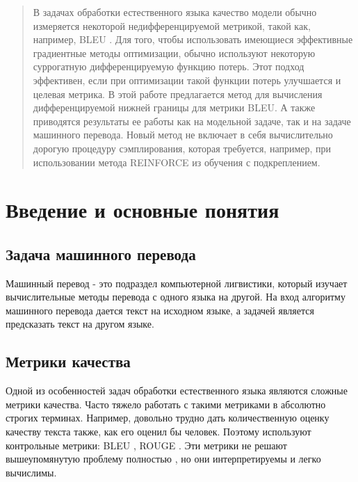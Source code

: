 \documentclass[14pt, a4paper]{extarticle}
\begin{document}
\begin{abstract}
В задачах обработки естественного языка качество модели обычно измеряется некоторой недифференцируемой метрикой, такой как, например, BLEU \cite{bleu}.
Для того, чтобы использовать имеющиеся эффективные градиентные методы оптимизации, обычно используют некоторую суррогатную дифференцируемую функцию потерь.
Этот подход эффективен, если при оптимизации такой функции потерь улучшается и целевая метрика.
В этой работе предлагается метод для вычисления дифференцируемой нижней границы для метрики BLEU.
А также приводятся результаты ее работы как на модельной задаче, так и на задаче машинного перевода.
Новый метод не включает в себя вычислительно дорогую процедуру сэмплирования,
которая требуется, например, при использовании метода REINFORCE из обучения с подкреплением.
\end{abstract}

\newpage
\section{Введение и основные понятия}

\subsection{Задача машинного перевода}
Машинный перевод - это подраздел компьютерной лигвистики, который изучает вычислительные методы перевода с одного языка на другой.
На вход алгоритму машинного перевода дается текст на исходном языке, а задачей является предсказать текст на другом языке.


\subsection{Метрики качества}

Одной из особенностей задач обработки естественного языка являются сложные метрики качества.
Часто тяжело работать с такими метриками в абсолютно строгих терминах.
Например, довольно трудно дать количественную оценку качеству текста также, как его оценил бы человек.
Поэтому используют контрольные метрики: BLEU \cite{bleu}, ROUGE \cite{rouge}.
Эти метрики не решают вышеупомянутую проблему полностью \cite{eval_empir},
но они интерпретируемы и легко вычислимы.
\end{document}
